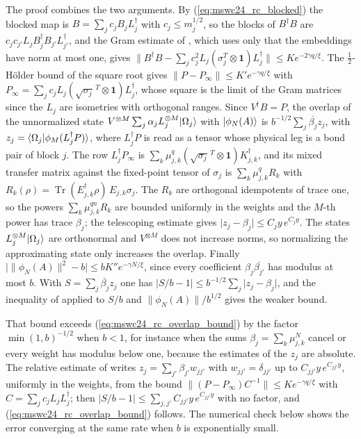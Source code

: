 \documentclass{article}
\begin{document}
The proof combines the two arguments. By (\ref{eq:mswc24_rc_blocked}) the blocked map is
$B=\sum_jc_jB_jL_j^\dagger$ with $c_j\leq m_j^{1/2}$, so the blocks of $B^\dagger B$ are
$c_jc_{j'}L_jB_j^\dagger B_{j'}L_{j'}^\dagger$, and the Gram estimate of
\cite{gap:mswc24_block_form_mixed_overlap}, which uses only that the embeddings have norm at most
one, gives $\lVert B^\dagger B-\sum_jc_j^2L_j(\sigma_j^T\otimes\mathbf 1)L_j^\dagger\rVert
\leq Ke^{-2\gamma q/\xi}$. The $\tfrac12$-H\"older bound of the square root gives
$\lVert P-P_\infty\rVert\leq K'e^{-\gamma q/\xi}$ with
$P_\infty=\sum_jc_jL_j(\sqrt{\sigma_j}^{\,T}\otimes\mathbf 1)L_j^\dagger$, whose square is the
limit of the Gram matrices since the $L_j$ are isometries with orthogonal ranges. Since
$V^\dagger B=P$, the overlap of the unnormalized state $V^{\otimes M}\sum_j\alpha_jL_j^{\otimes
M}|\Omega_j\rangle$ with $|\phi_N(A)\rangle$ is $b^{-1/2}\sum_j\overline{\beta_j}z_j$, with
$z_j=\langle \Omega_j | \phi_M(L_j^\dagger P) \rangle$, where $L_j^\dagger P$ is read as a tensor whose
physical leg is a bond pair of block $j$. The row $L_j^\dagger P_\infty$ is
$\sum_k\mu_{j,k}^q(\sqrt{\sigma_j}^{\,T}\otimes\mathbf 1)K_{j,k}^\dagger$, and its mixed transfer
matrix against the fixed-point tensor of $\sigma_j$ is $\sum_k\mu_{j,k}^qR_k$ with
$R_k(\rho)=\operatorname{Tr}(E_{j,k}^\dagger\rho)\,E_{j,k}\sigma_j$. The $R_k$ are orthogonal
idempotents of trace one, so the powers $\sum_k\mu_{j,k}^{qn}R_k$ are bounded uniformly in the
weights and the $M$-th power has trace $\beta_j$; the telescoping estimate gives
$\lvert z_j-\beta_j\rvert\leq C_jy\,e^{C_jy}$. The states $L_j^{\otimes M}|\Omega_j\rangle$ are
orthonormal and $V^{\otimes M}$ does not increase norms, so normalizing the approximating state
only increases the overlap. Finally $\lvert\lVert\phi_N(A)\rVert^2-b\rvert\leq bK''e^{-\gamma
N/\xi}$, since every coefficient $\beta_j\overline{\beta_{j'}}$ has modulus at most $b$. With
$S=\sum_j\overline{\beta_j}z_j$ one has $\lvert S/b-1\rvert\leq b^{-1/2}\sum_j\lvert
z_j-\beta_j\rvert$, and the inequality of \cite{gap:mswc24_block_form_mixed_overlap} applied to
$S/b$ and $\lVert\phi_N(A)\rVert/b^{1/2}$ gives the weaker bound.

That bound exceeds (\ref{eq:mswc24_rc_overlap_bound}) by the factor $\min(1,b)^{-1/2}$ when
$b<1$, for instance when the sums $\beta_j=\sum_k\mu_{j,k}^N$ cancel or every weight has modulus
below one, because the estimates of the $z_j$ are absolute. The relative estimate of
\cite{gap:mswc24_repeated_overlap_small_weight_sum} writes $z_j=\sum_{j'}\beta_{j'}w_{jj'}$ with
$w_{jj'}=\delta_{jj'}$ up to $C_{jj'}y\,e^{C_{jj'}y}$, uniformly in the weights, from the bound
$\lVert(P-P_\infty)C^{-1}\rVert\leq Ke^{-\gamma q/\xi}$ with $C=\sum_jc_jL_jL_j^\dagger$; then
$\lvert S/b-1\rvert\leq\sum_{j,j'}C_{jj'}y\,e^{C_{jj'}y}$ with no factor, and
(\ref{eq:mswc24_rc_overlap_bound}) follows. The numerical check below shows the error
converging at the same rate when $b$ is exponentially small.
\end{document}
